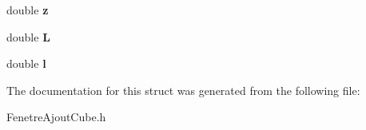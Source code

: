 \begin{DoxyCompactItemize}
\item 
\hypertarget{structFenetreAjoutCube_a39378b03f7047d10be8c4db0cc7bdce3}{
double {\bfseries z}}
\label{structFenetreAjoutCube_a39378b03f7047d10be8c4db0cc7bdce3}

\item 
\hypertarget{structFenetreAjoutCube_a85e1ea2d71edad8ff4f73032c0312498}{
double {\bfseries L}}
\label{structFenetreAjoutCube_a85e1ea2d71edad8ff4f73032c0312498}

\item 
\hypertarget{structFenetreAjoutCube_a2ba449f59cfd5e251a2a54f32915395c}{
double {\bfseries l}}
\label{structFenetreAjoutCube_a2ba449f59cfd5e251a2a54f32915395c}

\end{DoxyCompactItemize}


The documentation for this struct was generated from the following file:\begin{DoxyCompactItemize}
\item 
FenetreAjoutCube.h\end{DoxyCompactItemize}
